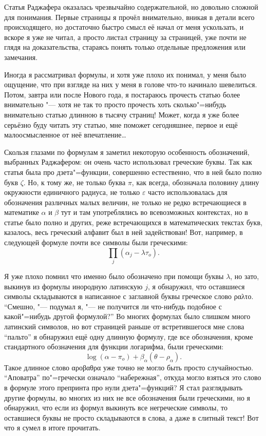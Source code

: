 Статья Раджафера оказалась чрезвычайно содержательной, но довольно сложной для
понимания.
Первые страницы я прочёл внимательно, вникая в детали всего происходящего, но
достаточно быстро смысл её начал от меня ускользать, и вскоре я уже не читал, а
просто листал страницу за страницей, уже почти не глядя на доказательства,
стараясь понять только отдельные предложения или замечания.

Иногда я рассматривал формулы, и хотя уже плохо их понимал, у меня было ощущение,
что при взгляде на них у меня в голове что-то начинало шевелиться.
Потом, завтра или после Нового года, я постараюсь прочесть статью более
внимательно "--- хотя не так то просто прочесть хоть сколько"=нибудь внимательно
статью длинною в тысячу страниц!
Может, когда я уже более серьёзно буду читать эту статью, мне поможет
сегодняшнее, первое и ещё малоосмысленное от неё впечатление\ldots

Скользя глазами по формулам я заметил некоторую особенность обозначений,
выбранных Раджафером: он очень часто использовал греческие буквы.
Так как статья была про дзета"=функции, совершенно естественно, что в ней было
полно букв $\zeta$.
Но, к тому же, не только буква $\pi$, как всегда, обозначала половину длину
окружности единичного радиуса, не только $\varepsilon$ часто использовалась для
обозначения различных малых величин, не только не редко встречающиеся в
математике $\alpha$ и $\beta$ тут и там употреблялись во всевозможных контекстах,
но в статье было полно и других, реже встречающихся в математических текстах
букв, казалось, весь греческий алфавит был в ней задействован!
Вот, например, в следующей формуле почти все символы были греческими:
\begin{equation*}
\prod_j\left(\alpha_j - \lambda\tau_o\right).
\end{equation*}

Я уже плохо помнил что именно было обозначено при помощи буквы $\lambda$, но
зато, выкинув из формулы инородную латинскую $j$, я обнаружил, что оставшиеся
символы складываются в написанное с заглавной буквы греческое слово
\foreignlanguage{greek}{ραλτο}.
\enquote{Смешно, "--- подумал я, "--- не получится ли что-нибудь подобное с
какой"=нибудь другой формулой?}
Во многих формулах было слишком много латинский символов, но вот страницей
раньше от встретившегося мне слова \enquote{пальто} я обнаружил ещё одну длинную
формулу, где все обозначения, кроме стандартного обозначения для функции
логарифма, были греческими:
\begin{equation*}
\log(\alpha - \pi_o) + \beta_\alpha(\theta - \rho_\alpha).
\end{equation*}
Такое длинное слово \foreignlanguage{greek}{αροβαθρα} уже точно не могло
быть просто случайностью.
\enquote{Аповатра} по"=гречески означало \enquote{набережная}, откуда могло
взяться это слово в формуле этого препринта про нули дзета"=функций?
Я стал разглядывать другие формулы, во многих из них не все обозначения были
греческими, но я обнаружил, что если из формул выкинуть все негреческие символы,
то оставшиеся буквы не просто складываются в слова, а даже в слитный текст!
Вот что я сумел в итоге прочитать.

